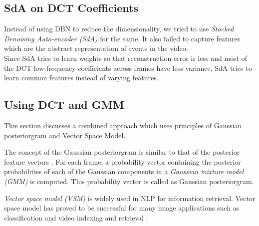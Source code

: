 \subsection{SdA on DCT Coefficients}
Instead of using DBN to reduce the dimensionality, we tried to use \textit{Stacked Denoising Auto-encoder (SdA)} for the same.  It also failed to capture features which are the abstract representation of events in the video.\\
Since SdA tries to learn weights so that reconstruction error is less and most of the DCT low-frequency coefficients across frames have less variance, SdA tries to learn common features instead of varying features.\\

\subsection{Using DCT and GMM}
\label{sec:event:dct_gmm}
This section discusses a combined approach which uses principles of Gaussian posteriorgram and Vector Space Model.

The concept of the Gaussian posteriorgram is similar to that of the posterior feature vectors \citep{zhang2010towards}.  For each frame, a probability vector containing the posterior probabilities of each of the Gaussian components in a \textit{Gaussian mixture model (GMM)} is computed.  This probability vector is called as  Gaussian posteriorgram.

\textit{Vector space model (VSM)} is widely used in NLP for information retrieval.  Vector space model has proved to be successful for many image applications such as classification and video indexing and retrieval \citep{galmar2007analysis}.

